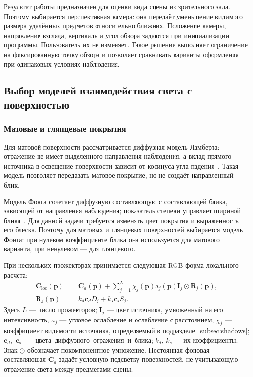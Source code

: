 Результат работы предназначен для оценки вида сцены из зрительного зала. Поэтому выбирается перспективная камера: она передаёт уменьшение видимого размера удалённых предметов относительно ближних. Положение камеры, направление взгляда, вертикаль и угол обзора задаются при инициализации программы. Пользователь их не изменяет. Такое решение выполняет ограничение на фиксированную точку обзора и позволяет сравнивать варианты оформления при одинаковых условиях наблюдения.

\subsection{Выбор моделей взаимодействия света с поверхностью}
\label{subsec:materials}

\subsubsection{Матовые и глянцевые покрытия}

Для матовой поверхности рассматривается диффузная модель Ламберта: отражение не имеет выделенного направления наблюдения, а вклад прямого источника в освещение поверхности зависит от косинуса угла падения~\cite[разд.~9.2]{pbrt4}. Такая модель позволяет передавать матовое покрытие, но не создаёт направленный блик.

Модель Фонга сочетает диффузную составляющую с составляющей блика, зависящей от направления наблюдения; показатель степени управляет шириной блика~\cite[слайды~38--43]{phong-model-notes}. Для данной задачи требуется изменять цвет покрытия и выраженность его блеска. Поэтому для матовых и глянцевых поверхностей выбирается модель Фонга: при нулевом коэффициенте блика она используется для матового варианта, при ненулевом --- для глянцевого.

При нескольких прожекторах принимается следующая RGB-форма локального расчёта:
\begin{equation}
\begin{aligned}
  \mathbf C_{\mathrm{loc}}(\mathbf p)
    &=\mathbf C_a(\mathbf p)+
      \sum_{j=1}^{L}\chi_j(\mathbf p)a_j(\mathbf p)
      \mathbf I_j\odot\mathbf R_j(\mathbf p),\\
  \mathbf R_j(\mathbf p)
    &=k_d\mathbf c_dD_j+k_s\mathbf c_sS_j.
\end{aligned}
\label{eq:local-light}
\end{equation}
Здесь $L$ --- число прожекторов; $\mathbf I_j$ --- цвет источника, умноженный на его интенсивность; $a_j$ --- угловое ослабление и ослабление с расстоянием; $\chi_j$ --- коэффициент видимости источника, определяемый в подразделе~\ref{subsec:shadows}; \mbox{$\mathbf c_d$, $\mathbf c_s$ --- цвета диффузного отражения и блика}; $k_d$, $k_s$ --- их коэффициенты. Знак $\odot$ обозначает покомпонентное умножение. Постоянная фоновая составляющая $\mathbf C_a$ задаёт условную подсветку поверхностей, не учитывающую отражение света между предметами сцены.

